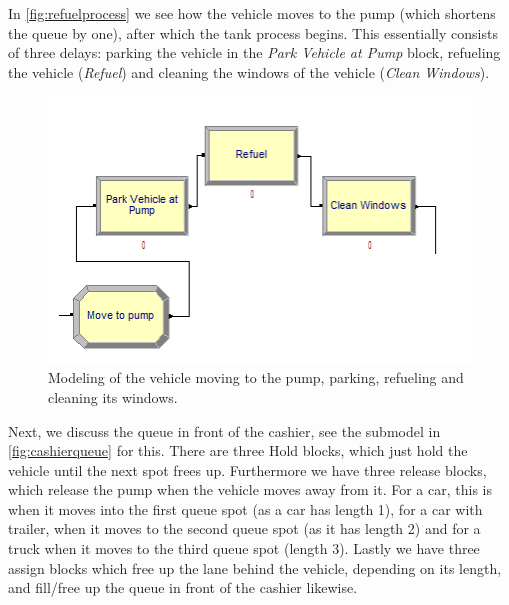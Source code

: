 In \autoref{fig:refuelprocess} we see how the vehicle moves to the pump (which shortens the queue by one), after which the tank process begins. 
This essentially consists of three delays: parking the vehicle in the \textit{Park Vehicle at Pump} block, refueling the vehicle (\textit{Refuel}) and cleaning the windows of the vehicle (\textit{Clean Windows}).

\begin{figure}[h]
\begin{center}
	\includegraphics[scale=1]{images/model-description/refuel-process.PNG}
	\caption{Modeling of the vehicle moving to the pump, parking, refueling and cleaning its windows.}
	\label{fig:refuelprocess}
\end{center}
\end{figure}

Next, we discuss the queue in front of the cashier, see the submodel in \autoref{fig:cashierqueue} for this. 
There are three Hold blocks, which just hold the vehicle until the next spot frees up. 
Furthermore we have three release blocks, which release the pump when the vehicle moves away from it. 
For a car, this is when it moves into the first queue spot (as a car has length 1), for a car with trailer, when it moves to the second queue spot (as it has length 2) and for a truck when it moves to the third queue spot (length 3). 
Lastly we have three assign blocks which free up the lane behind the vehicle, depending on its length, and fill/free up the queue in front of the cashier likewise.

